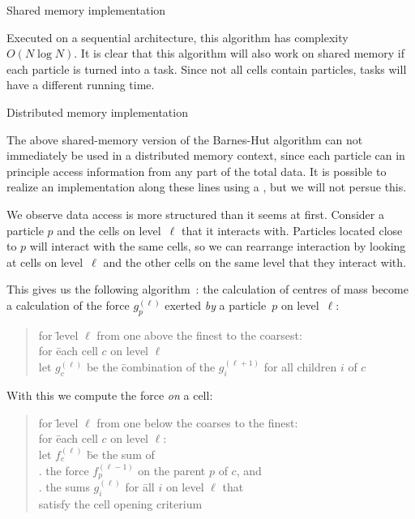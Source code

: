  {Shared memory implementation}

Executed on a sequential architecture, this algorithm has complexity
$O(N\log N)$. It is clear that this algorithm will also work on shared
memory if each particle is turned into a task. Since not all cells
contain particles, tasks will have a different running time.

 {Distributed memory implementation}

The above shared-memory version of the Barnes-Hut algorithm can not
immediately be used in a distributed memory context, since each
particle can in principle access information from any part of the
total data. It is possible to realize an implementation along these
lines using a , but we will not persue
this.

We observe data access is more structured than it seems at
first. Consider a particle $p$ and the cells on level~$\ell$ that it
interacts with. Particles located close to $p$ will interact with the
same cells, so we can rearrange interaction by looking at cells on
level~$\ell$ and the other cells on the same level that they interact
with.

This gives us the following algorithm~\cite{Katzenelson:nbody}: the
calculation of centres of mass become a calculation of the force
$g^{(\ell)}_p$ exerted \emph{by} a particle~$p$ on level~$\ell$:
\begin{quotation}
  \begin{tabbing}
    for \=level $\ell$ from one above the finest to the coarsest:\\
    \>for \=each cell $c$ on level $\ell$\\
    \>\>let $g^{(\ell)}_c$ be the \=combination of the $g^{(\ell+1)}_i$
    for all children $i$ of $c$
  \end{tabbing}
\end{quotation}
With this we compute the force \emph{on} a cell:
\begin{quotation}
  \begin{tabbing}
    for \=level $\ell$ from one below the coarses to the finest:\\
    \>for \=each cell $c$ on level $\ell$:\\
    \>\>let $f^{(\ell)}_c$ \=be the sum of\\
    \>\>. the force $f^{(\ell-1)}_p$ on the parent $p$ of $c$, and\\
    \>\>. the sums $g^{(\ell)}_i$ for \=all $i$ on level $\ell$ that\\
    \>\>\>\>satisfy the cell opening criterium
  \end{tabbing}
\end{quotation}


